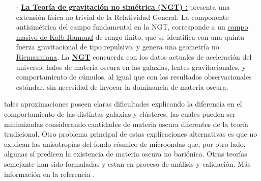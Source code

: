 \begin{itemize}

\item[-] \href{https://en.wikipedia.org/wiki/Nonsymmetric_gravitational_theory}{\textbf{La Teoría de gravitación no simétrica (NGT) :}}
presenta una extensión física no trivial de la Relatividad General. La componente antisimétrica del campo fundamental en la NGT, corresponde a un \href{https://en.wikipedia.org/wiki/Kalb\%E2\%80\%93Ramond_field}{campo masivo de Kalb-Ramond} de rango finito, que se identifica con una quinta fuerza gravitacional de tipo repulsivo, y genera una geometría no \href{https://en.wikipedia.org/wiki/Riemann_hypothesis}{Riemanniana}.
La \href{https://en.wikipedia.org/wiki/Nonsymmetric_gravitational_theory}{\textbf{NGT}} concuerda con los datos actuales de aceleración del universo, halos de materia
oscura en las galaxias, lentes gravitacionales, y comportamiento de cúmulos, al igual que con los resultados observacionales estándar, sin necesidad de invocar la dominancia de materia oscura.
\end{itemize}
tales aproximaciones poseen claras dificultades explicando la diferencia en el comportamiento de las distintas galaxias y clústeres, las cuales pueden ser minimizadas considerando cantidades de materia oscura diferentes de la teoría tradicional. Otro problema principal de estas explicaciones alternativas es que no explican las anisotropías del fondo cósmico de microondas que, por otro lado, algunas sí predicen la existencia de materia oscura no bariónica. Otras teorías semejante han sido formaladas y estan en proceso de análisis y validación. Más información en la referencia \cite{rojas_teorigravitacion_2008}.



